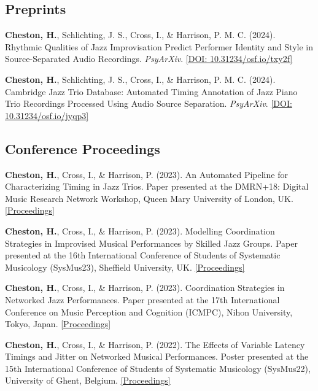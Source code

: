 \documentclass[11pt]{res} %
\begin{document}
\begin{resume}
\subsection{Preprints}
\begin{hangparas}{.25in}{1}
\textbf{Cheston, H.}, Schlichting, J. S., Cross, I., \& Harrison, P. M. C. (2024). Rhythmic Qualities of Jazz Improvisation Predict Performer Identity and Style in Source-Separated Audio Recordings. \emph{PsyArXiv}. \href{https://doi.org/10.31234/osf.io/txy2f}{[DOI: 10.31234/osf.io/txy2f]}

\textbf{Cheston, H.}, Schlichting, J. S., Cross, I., \& Harrison, P. M. C. (2024). Cambridge Jazz Trio Database: Automated Timing Annotation of Jazz Piano Trio Recordings Processed Using Audio Source Separation. \emph{PsyArXiv}. \href{https://doi.org/10.31234/osf.io/jyqp3}{[DOI: 10.31234/osf.io/jyqp3]}
\end{hangparas}

\subsection{Conference Proceedings}
\begin{hangparas}{.25in}{1}
\textbf{Cheston, H.}, Cross, I., \& Harrison, P. (2023). An Automated Pipeline for Characterizing Timing in Jazz Trios. Paper presented at the DMRN+18: Digital Music Research Network Workshop, Queen Mary University of London, UK. \href{https://www.qmul.ac.uk/dmrn/media/dmrn/DMRN-18-Proceedings.pdf}{[Proceedings]}

\textbf{Cheston, H.}, Cross, I., \& Harrison, P. (2023). Modelling Coordination Strategies in Improvised Musical Performances by Skilled Jazz Groups. Paper presented at the 16th International Conference of Students of Systematic Musicology (SysMus23), Sheffield University, UK. \href{https://drive.google.com/file/d/14F5Xe8qfxfWpMW6pGuIl8fcaIYbmFDtt/view}{[Proceedings]}

\textbf{Cheston, H.}, Cross, I., \& Harrison, P. (2023). Coordination Strategies in Networked Jazz Performances. Paper presented at the 17th International Conference on Music Perception and Cognition (ICMPC), Nihon University, Tokyo, Japan. \href{https://icmpc17.com/proceedings-in-zip/ICMPC17-APSCOM7-e-Proceedings.zip/}{[Proceedings]}

\textbf{Cheston, H.}, Cross, I., \& Harrison, P. (2022). The Effects of Variable Latency Timings and Jitter on Networked Musical Performances. Poster presented at the 15th International Conference of Students of Systematic Musicology (SysMus22), University of Ghent, Belgium. \href{http://hdl.handle.net/1854/LU-01GVD6WBCVPGRAHMNYR1CEXF57}{[Proceedings]}


\end{hangparas}
\end{resume}
\end{document}
